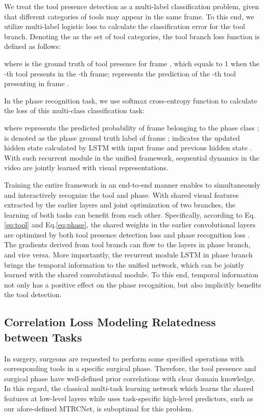 \documentclass{elsarticle}
\begin{document}
We treat the tool presence detection as a multi-label classification problem, given that different categories of tools may appear in the same frame.
To this end, we utilize multi-label logistic loss to calculate the classification error for the tool branch.
Denoting the  as the set of tool categories, the tool branch loss function is defined as follows:

where  is the ground truth of tool presence for frame , which equals to 1 when the -th tool presents in the -th frame;
 represents the prediction of the -th tool presenting in frame .

In the phase recognition task, we use softmax cross-entropy function to calculate the loss of this multi-class classification task:

where  represents the predicted probability of frame  belonging to the phase class ;
 is denoted as the phase ground truth label of frame ;
 indicates the updated hidden state calculated by LSTM with input frame  and previous hidden state .
With such recurrent module in the unified framework, sequential dynamics in the video are jointly learned with visual representations.

Training the entire framework in an end-to-end manner enables to simultaneously and interactively recognize the tool and phase.
With shared visual features extracted by the earlier layers and joint optimization of two branches, the learning of both tasks can benefit from each other.
Specifically, according to Eq.\ref{eq:tool} and Eq.\ref{eq:phase}, the shared weights  in the earlier convolutional layers  are optimized by both tool presence detection loss  and phase recognition loss .
The gradients derived from tool branch can flow to the layers in phase branch, and vice versa.
More importantly, the recurrent module LSTM in phase branch brings the temporal information to the unified network, which can be jointly learned with the shared convolutional module.
To this end, temporal information not only has a positive effect on the phase recognition, but also implicitly benefits the tool detection.


\subsection{Correlation Loss Modeling Relatedness between Tasks}
In surgery, surgeons are requested to perform some specified operations with corresponding tools in a specific surgical phase.
Therefore, the tool presence and surgical phase have well-defined prior correlations with clear domain knowledge.
In this regard, the classical multi-task learning network which learns the shared features at low-level layers while uses task-specific high-level predictors, such as our afore-defined MTRCNet, is suboptimal for this problem.
\end{document}
